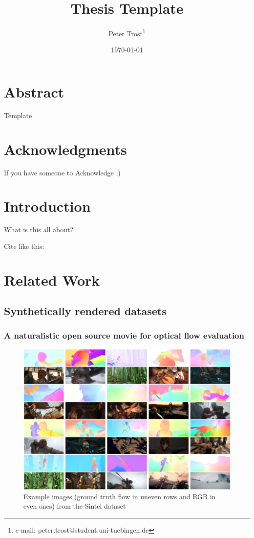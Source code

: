 \documentclass[a4paper,cleardoubleempty,BCOR1cm]{scrbook}
\title{Thesis Template}
\author{Peter Trost\thanks{e-mail: peter.trost@student.uni-tuebingen.de}}
\date{\today}
\begin{document}


\chapter*{Abstract}
Template

\chapter*{Acknowledgments}
If you have someone to Acknowledge ;)

\tableofcontents


\chapter{Introduction}
What is this all about?

Cite like this: \cite{agarwal2011}

\chapter{Related Work}
\section{Synthetically rendered datasets}
\subsection{A naturalistic open source movie for optical flow evaluation}
\cite{Butler:ECCV:2012}

\begin{figure}[h]
	\centering
	\includegraphics[width=\textwidth]{images/Sintel.png}
	\caption{Example images (ground truth flow in uneven rows and RGB in even ones) from the Sintel dataset}
	\label{Sintel}
\end{figure}
\end{document}
